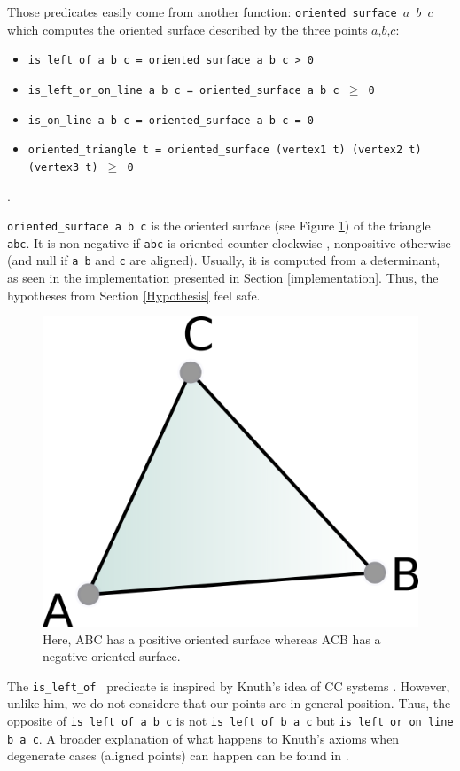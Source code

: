 \documentclass[a4paper,10pt]{article}
\def\ttt#1#2{{\tt{\color{black}#1} #2}}
\begin{document}
Those predicates easily come from another function: \ttt{oriented\_surface}{$a$ $b$ $c$}  which computes the oriented surface described by the three points $a$,$b$,$c$:
\begin{itemize}
\item \ttt{is\_left\_of}{a b c = oriented\_surface a b c > 0}
  \item \ttt{is\_left\_or\_on\_line}{a b c = oriented\_surface a b c $\geq$ 0}
  \item \ttt{is\_on\_line}{a b c = oriented\_surface a b c = 0}
 \item \ttt{oriented\_triangle}{t = oriented\_surface (vertex1 t) (vertex2 t) (vertex3 t) $\geq$ 0} 
  \end{itemize}.


  {\tt oriented\_surface a b c} is the oriented surface (see Figure \ref{surface}) of the triangle {\tt abc}. It is non-negative if {\tt abc} is oriented counter-clockwise , nonpositive otherwise (and null if {\tt a b} and {\tt c} are aligned).
Usually, it is computed from a determinant, as seen in the implementation presented in Section \ref{implementation}. Thus, the hypotheses from Section \ref{Hypothesis} feel safe.

\begin{figure}
  \centering
  \includegraphics{Surface}
  \caption{\label{surface} Here, ABC has a positive oriented surface whereas ACB has a negative oriented surface.}
\end{figure}


  The \ttt{is\_left\_of}{} predicate is inspired by Knuth's idea of CC systems \cite{Knuth92}.
  However, unlike him, we do not considere that our points are in general position. Thus, the opposite of \ttt{is\_left\_of}{a b c} is not \ttt{is\_left\_of}{b a c} but \ttt{is\_left\_or\_on\_line}{b a c}. A broader explanation of what happens to Knuth's axioms when degenerate cases (aligned points) can happen can be found in \cite{Hull}. \label{knuthpic}
\end{document}
